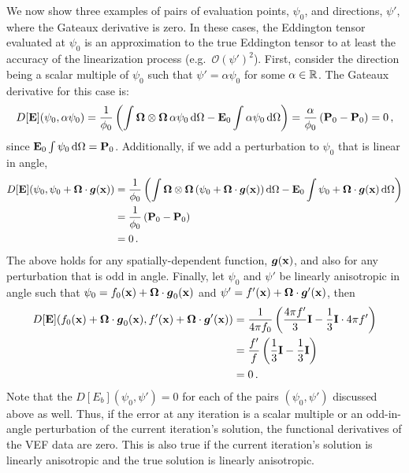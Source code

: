 \documentclass[../doc.tex]{subfiles}
\begin{document}
We now show three examples of pairs of evaluation points, $\psi_0$, and directions, $\psi'$, where the Gateaux derivative is zero. In these cases, the Eddington tensor evaluated at $\psi_0$ is an approximation to the true Eddington tensor to at least the accuracy of the linearization process (e.g.~$\mathcal{O}(\psi')^2$). 
First, consider the direction being a scalar multiple of $\psi_0$ such that $\psi' = \alpha \psi_0$ for some $\alpha \in \mathbb{R}$. The Gateaux derivative for this case is: 
	\begin{equation}
		D[\boldsymbol{\mathrm{E}}](\psi_0,\alpha\psi_0) = \frac{1}{\phi_0}\left( \int \boldsymbol{\Omega}\otimes\boldsymbol{\Omega}\,\alpha\psi_0 \mathop{}\!\mathrm{d}\Omega - \boldsymbol{\mathrm{E}}_0 \int \alpha \psi_0 \mathop{}\!\mathrm{d} \Omega \right) = \frac{\alpha}{\phi_0}\left( \boldsymbol{\mathrm{P}}_0 - \boldsymbol{\mathrm{P}}_0 \right) = 0 \,,
	\end{equation}
since $\boldsymbol{\mathrm{E}}_0 \int \psi_0 \mathop{}\!\mathrm{d} \Omega = \boldsymbol{\mathrm{P}}_0$. 
Additionally, if we add a perturbation to $\psi_0$ that is linear in angle, 
	\begin{equation}
	\begin{aligned}
		D[\boldsymbol{\mathrm{E}}](\psi_0, \psi_0 + \boldsymbol{\Omega}\cdot\boldsymbol{g}(\boldsymbol{\mathrm{x}})) &= \frac{1}{\phi_0}\left( \int \boldsymbol{\Omega}\otimes\boldsymbol{\Omega}\left( \psi_0 + \boldsymbol{\Omega}\cdot\boldsymbol{g}(\boldsymbol{\mathrm{x}}) \right)\mathop{}\!\mathrm{d} \Omega - \boldsymbol{\mathrm{E}}_0 \int \psi_0 + \boldsymbol{\Omega}\cdot\boldsymbol{g}(\boldsymbol{\mathrm{x}}) \mathop{}\!\mathrm{d} \Omega \right)\\
		&= \frac{1}{\phi_0} \left( \boldsymbol{\mathrm{P}}_0 - \boldsymbol{\mathrm{P}}_0 \right) \\
		&= 0 \,. 
	\end{aligned}
	\end{equation}
The above holds for any spatially-dependent function, $\boldsymbol{g}(\boldsymbol{\mathrm{x}})$, and also for any perturbation that is odd in angle. 
Finally, let $\psi_0$ and $\psi'$ be linearly anisotropic in angle such that $\psi_0 = f_0(\boldsymbol{\mathrm{x}}) + \boldsymbol{\Omega}\cdot\boldsymbol{g}_0(\boldsymbol{\mathrm{x}})$ and $\psi' = f'(\boldsymbol{\mathrm{x}}) + \boldsymbol{\Omega}\cdot\boldsymbol{g}'(\boldsymbol{\mathrm{x}})$, then 
	\begin{equation}
	\begin{aligned}
		D[\boldsymbol{\mathrm{E}}](f_0(\boldsymbol{\mathrm{x}}) + \boldsymbol{\Omega}\cdot\boldsymbol{g}_0(\boldsymbol{\mathrm{x}}), f'(\boldsymbol{\mathrm{x}}) + \boldsymbol{\Omega}\cdot\boldsymbol{g}'(\boldsymbol{\mathrm{x}})) &= \frac{1}{4\pi f_0}\left( \frac{4\pi f'}{3}\boldsymbol{\mathrm{I}} - \frac{1}{3}\boldsymbol{\mathrm{I}} \cdot 4\pi f' \right) \\
		&= \frac{f'}{f}\left( \frac{1}{3}\boldsymbol{\mathrm{I}} - \frac{1}{3}\boldsymbol{\mathrm{I}} \right) \\
		&= 0 \,. 
	\end{aligned}
	\end{equation}
Note that the $D[E_b](\psi_0,\psi') = 0$ for each of the pairs $(\psi_0,\psi')$ discussed above as well. 
Thus, if the error at any iteration is a scalar multiple or an odd-in-angle perturbation of the current iteration's solution, the functional derivatives of the VEF data are zero. This is also true if the current iteration's solution is linearly anisotropic and the true solution is linearly anisotropic. 
\end{document}
